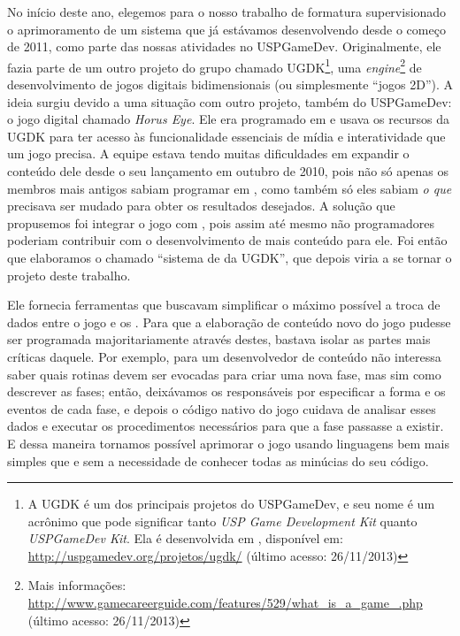     No início deste ano, elegemos para o nosso trabalho de formatura supervisionado
    o aprimoramento de um sistema que já estávamos desenvolvendo desde o começo de
    2011, como parte das nossas atividades no USPGameDev. Originalmente, ele fazia
    parte de um outro projeto do grupo chamado UGDK\footnote{A UGDK é um dos
      principais projetos do USPGameDev, e seu
      nome é um acrônimo que pode significar tanto \emph{USP Game Development
      Kit} quanto \emph{USPGameDev Kit}. Ela é desenvolvida em \CXX{}, disponível em:
      \url{http://uspgamedev.org/projetos/ugdk/} (último acesso: 26/11/2013)
    }, uma \emph{engine}\footnote{Mais informações:
      \url{http://www.gamecareerguide.com/features/529/what\_is\_a\_game\_.php}
      (último acesso: 26/11/2013)
    } de desenvolvimento de jogos digitais bidimensionais (ou
    simplesmente ``jogos 2D''). A ideia surgiu devido a uma situação com
    outro projeto, também do USPGameDev: o jogo digital chamado
    \emph{Horus Eye}\footnotemark{}. Ele era programado em \CXX{} e usava os
    recursos da UGDK para ter acesso às funcionalidade essenciais de mídia e
    interatividade que um jogo precisa. A equipe estava tendo muitas dificuldades
    em expandir o conteúdo dele desde o seu lançamento em outubro de 2010, pois
    não só apenas os membros mais antigos sabiam programar em \CXX{}, como também
    só eles sabiam \emph{o que} precisava ser mudado para obter os resultados
    desejados. A solução que propusemos foi integrar o jogo com , pois
    assim até mesmo não programadores poderiam contribuir com o desenvolvimento
    de mais conteúdo para ele. Foi então que elaboramos o chamado ``sistema de
     da UGDK'', que depois viria a se tornar o projeto deste trabalho.


    Ele fornecia ferramentas que buscavam simplificar o máximo possível a
    troca de dados entre o jogo e os . Para que a elaboração de conteúdo
    novo do jogo pudesse ser programada majoritariamente através destes, bastava
    isolar as partes mais críticas daquele. Por exemplo, para um desenvolvedor de
    conteúdo não interessa saber quais rotinas devem ser evocadas para criar uma
    nova fase, mas sim como descrever as fases; então, deixávamos os 
    responsáveis por especificar a forma e os eventos de cada fase, e depois o
    código nativo do jogo cuidava de analisar esses dados e executar os
    procedimentos necessários para que a fase passasse a existir. E dessa maneira
    tornamos possível aprimorar o jogo usando linguagens bem mais simples que \CXX{}
    e sem a necessidade de conhecer todas as minúcias do seu código.

